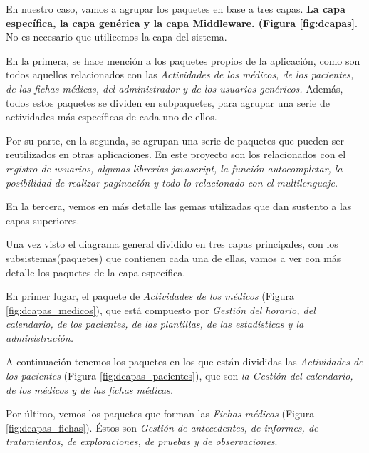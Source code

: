 \documentclass[a4paper,oneside,11pt]{book}
\begin{document}
		En nuestro caso, vamos a agrupar los paquetes en base a tres capas. \textbf{La capa específica, la capa genérica y la capa Middleware. (Figura \ref{fig:dcapas}}. No es necesario que utilicemos la capa del sistema.
		
		En la primera, se hace mención a los paquetes propios de la aplicación, como son todos aquellos relacionados con las \textit{Actividades de los médicos, de los pacientes, de las fichas médicas, del administrador y de los usuarios genéricos.} Además, todos estos paquetes se dividen en subpaquetes, para agrupar una serie de actividades más específicas de cada uno de ellos. 
		
		Por su parte, en la segunda, se agrupan una serie de paquetes que pueden ser reutilizados en otras aplicaciones. En este proyecto son los relacionados con el \textit{registro de usuarios, algunas librerías javascript, la función autocompletar, la posibilidad de realizar paginación y todo lo relacionado con el multilenguaje.}
		
		En la tercera, vemos en más detalle las gemas utilizadas que dan sustento a las capas superiores.
		
		Una vez visto el diagrama general dividido en tres capas principales, con los subsistemas(paquetes) que contienen cada una de ellas, vamos a ver con más detalle los paquetes de la capa específica.
		
		En primer lugar, el paquete de \textit{Actividades de los médicos} (Figura \ref{fig:dcapas_medicos}), que está compuesto por \textit{Gestión del horario, del calendario, de los pacientes, de las plantillas, de las estadísticas y la administración.}
		
		A continuación tenemos los paquetes en los que están divididas las \textit{Actividades de los pacientes} (Figura \ref{fig:dcapas_pacientes}), que son \textit{la Gestión del calendario, de los médicos y de las fichas médicas.}
		
		Por último, vemos los paquetes que forman las \textit{Fichas médicas} (Figura \ref{fig:dcapas_fichas}). Éstos son \textit{Gestión de antecedentes, de informes, de tratamientos, de exploraciones, de pruebas y de observaciones}.
		
\end{document}
